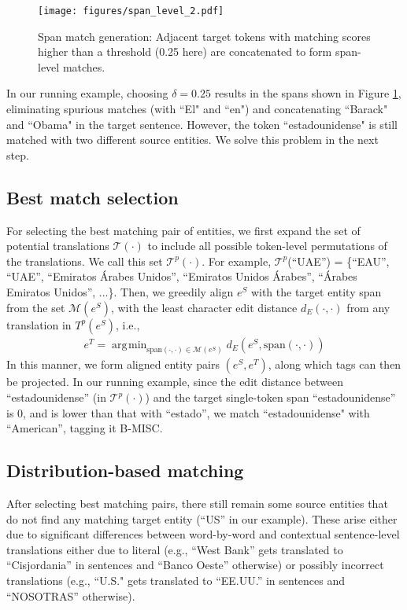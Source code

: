 \documentclass[11pt,a4paper]{article}
\DeclareMathOperator*{\argmin}{\arg\!\min}
\begin{document}
\begin{figure}[htb]
    \centering
    \texttt{[image: figures/span\_level\_2.pdf]}
    \caption{Span match generation: Adjacent target tokens with matching scores higher than a threshold (0.25 here) are concatenated to form span-level matches.}
\label{fig:span-level}
\end{figure}



In our running example, choosing $\delta = 0.25$ 
results in the spans shown in Figure \ref{fig:span-level}, 
eliminating spurious matches (with ``El" and ``en") 
and concatenating ``Barack" and ``Obama" in the target sentence. 
However, the token ``estadounidense" is still matched 
with two different source entities. 
We solve this problem in the next step.



\subsection{Best match selection \label{sec:best-match-select}}
For selecting the best matching pair of entities, 
we first expand the set of potential translations $\mathcal{T}(\cdot)$
to include all possible token-level permutations of the translations. 
We call this set $\mathcal{T}^{p}(\cdot)$. For example, $\mathcal{T}^{p}$(``UAE'') = \{``EAU'', ``UAE'', ``Emiratos \'Arabes Unidos'', ``Emiratos Unidos \'Arabes'', ``\'Arabes Emiratos Unidos'', ...\}.
Then, we greedily align $e^S$ with the target entity span from the set $\mathcal{M}(e^S)$, 
with the least character edit distance $d_E(\cdot, \cdot)$ 
from any translation in $T^{p}(e^S)$, i.e.,
\begin{align*}
e^T = \argmin_{\text{span}(\cdot, \cdot) \in \mathcal{M} (e^S)} d_{E}(e^S, \text{span}(\cdot, \cdot))
\end{align*}
In this manner, we form 
aligned entity pairs $(e^S, e^T)$, 
along which tags can then be projected. 
In our running example, since the edit distance between ``estadounidense'' 
(in $\mathcal{T}^p(\cdot)$) and the target single-token span ``estadounidense'' is $0$, 
and is lower than that with ``estado'', 
we match ``estadounidense" with ``American'', tagging it B-MISC.











\subsection{Distribution-based matching}
After selecting best matching pairs, 
there still remain some source entities 
that do not find any matching target entity (``US'' in our example). 
These arise either due to significant differences between word-by-word 
and contextual sentence-level translations either due to literal
(e.g., ``West Bank'' gets translated to ``Cisjordania''
in sentences and ``Banco Oeste'' otherwise) 
or possibly incorrect translations
(e.g., ``U.S." gets translated to  ``EE.UU.'' in sentences and ``NOSOTRAS'' otherwise). 
\end{document}
